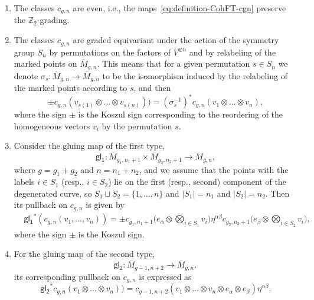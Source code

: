 \documentclass{amsart}
\numberwithin{equation}{section} %
\theoremstyle{plain}
\theoremstyle{remark}
\begin{document}
\begin{enumerate}
\item[i.] The classes $c_{g,n}$ are even, i.e., the maps~\eqref{eq:definition-CohFT-cgn} preserve the $\mathbb{Z}_2$-grading.  
\item[ii.] The classes $c_{g,n}$ are graded equivariant under the action of the symmetry group $S_n$ by permutations on the factors of $V^{\otimes n}$ and by relabeling of the marked points on $\overline{M}_{g,n}$. 
This means that for a given permutation $s\in S_n$ we denote $\sigma_s\colon \overline{M}_{g,n}\to \overline{M}_{g,n}$ to be the isomorphism induced by the relabeling of the marked points according to $s$, and then
\begin{equation*}
\pm c_{g,n}(v_{s(1)}\otimes\ldots\otimes v_{s(n)})) = (\sigma_s^{-1})^*c_{g,n}(v_1\otimes\ldots\otimes v_n),
\end{equation*} 
where the sign $\pm$ is the Koszul sign corresponding to the reordering of the homogeneous vectors $v_i$ by the permutation $s$. 
﻿
\item[iii.] Consider the gluing map of the first type,
\begin{equation*}
\mathsf{gl_1}\colon \overline{M}_{g_1,n_1+1}\times\overline{M}_{g_2,n_2+1}\rightarrow \overline{M}_{g,n},
\end{equation*}
where $g=g_1+g_2$ and $n=n_1+n_2$, and we assume that the points with the labels $i\in S_1$ (resp., $i\in S_2$) lie on the first (resp., second) component of the degenerated curve, so $S_1\sqcup S_2 = \{1,\dots,n\}$ and $|S_1|=n_1$ and $|S_2|=n_2$. Then its pullback on $c_{g,n}$ is given by
\begin{align*}
& \mathsf{gl_1}^*(c_{g,n}(v_1,\dots,v_n))= %
\pm c_{g_1,n_1+1}\big( e_\alpha \otimes \bigotimes_{i\in S_1} v_i \big)\eta^{\alpha\beta}c_{g_2,n_2+1}\big(e_\beta\otimes \bigotimes_{i\in S_2} v_i\big),
\end{align*}
where the sign $\pm$ is the Koszul sign. 
\item[iv.] For the gluing map of the second type,
\begin{equation*}
\mathsf{gl_2}\colon \overline{M}_{g-1,n+2}\rightarrow \overline{M}_{g,n},
\end{equation*}
its corresponding pullback on $c_{g,n}$ is expressed as
\begin{equation*}
\mathsf{gl_2}^*c_{g,n}(v_1\otimes \dots \otimes v_n))=c_{g-1,n+2}(v_1\otimes \dots\otimes v_{n}\otimes e_\alpha \otimes e_\beta)\eta^{\alpha\beta}.

\end{equation*}
\end{enumerate}
\end{document}
